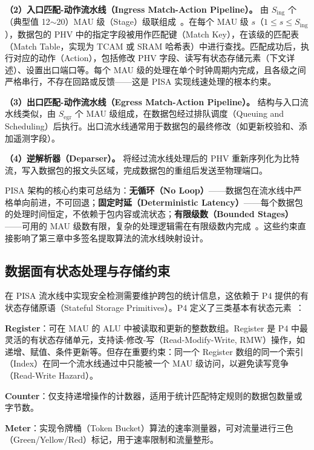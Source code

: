 \textbf{（2）入口匹配-动作流水线（Ingress Match-Action Pipeline）。} 由 $S_{\text{ing}}$ 个（典型值 12$\sim$20）MAU 级（Stage）级联组成~\cite{bosshart2013rmt, p4_survey}。在每个 MAU 级 $s$（$1 \leq s \leq S_{\text{ing}}$），数据包的 PHV 中的指定字段被用作匹配键（Match Key），在该级的匹配表（Match Table，实现为 TCAM 或 SRAM 哈希表）中进行查找。匹配成功后，执行对应的动作（Action），包括修改 PHV 字段、读写有状态存储元素（下文详述）、设置出口端口等。每个 MAU 级的处理在单个时钟周期内完成，且各级之间严格串行，不存在回路或反馈——这是 PISA 实现线速处理的根本约束。

\textbf{（3）出口匹配-动作流水线（Egress Match-Action Pipeline）。} 结构与入口流水线类似，由 $S_{\text{egr}}$ 个 MAU 级组成，在数据包经过排队调度（Queuing and Scheduling）后执行。出口流水线通常用于数据包的最终修改（如更新校验和、添加遥测字段）。

\textbf{（4）逆解析器（Deparser）。} 将经过流水线处理后的 PHV 重新序列化为比特流，写入数据包的报文头区域，完成数据包的重组后发送至物理端口。

PISA 架构的核心约束可总结为：\textbf{无循环（No Loop）}——数据包在流水线中严格单向前进，不可回退；\textbf{固定时延（Deterministic Latency）}——每个数据包的处理时间恒定，不依赖于包内容或流状态；\textbf{有限级数（Bounded Stages）}——可用的 MAU 级数有限，复杂的处理逻辑需在有限级数内完成~\cite{bosshart2013rmt, p4_survey}。这些约束直接影响了第三章中多签名提取算法的流水线映射设计。

\subsection{数据面有状态处理与存储约束}

在 PISA 流水线中实现安全检测需要维护跨包的统计信息，这依赖于 P4 提供的有状态存储原语（Stateful Storage Primitives）。P4 定义了三类基本有状态元素~\cite{bosshart2014p4, p4_survey}：

\textbf{Register}：可在 MAU 的 ALU 中被读取和更新的整数数组。Register 是 P4 中最灵活的有状态存储单元，支持读-修改-写（Read-Modify-Write, RMW）操作，如递增、赋值、条件更新等。但存在重要约束：同一个 Register 数组的同一个索引（Index）在同一个流水线通过中只能被一个 MAU 级访问，以避免读写竞争（Read-Write Hazard）。

\textbf{Counter}：仅支持递增操作的计数器，适用于统计匹配特定规则的数据包数量或字节数。

\textbf{Meter}：实现令牌桶（Token Bucket）算法的速率测量器，可对流量进行三色（Green/Yellow/Red）标记，用于速率限制和流量整形。

